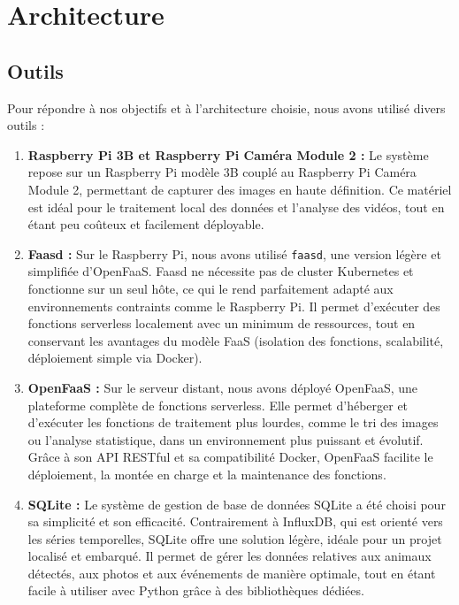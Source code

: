 \documentclass[a4paper,11pt]{article}
\begin{document}
	\section{Architecture}
	\subsection{Outils}
	Pour répondre à nos objectifs et à l’architecture choisie, nous avons utilisé divers outils :
	\begin{enumerate}
			
	\item \textbf{Raspberry Pi 3B et Raspberry Pi Caméra Module 2 :} Le système repose sur un Raspberry Pi modèle 3B couplé au Raspberry Pi Caméra Module 2, permettant de capturer des images en haute définition. Ce matériel est idéal pour le traitement local des données et l’analyse des vidéos, tout en étant peu coûteux et facilement déployable.
	
	\item \textbf{Faasd :} Sur le Raspberry Pi, nous avons utilisé \texttt{faasd}, une version légère et simplifiée d’OpenFaaS. Faasd ne nécessite pas de cluster Kubernetes et fonctionne sur un seul hôte, ce qui le rend parfaitement adapté aux environnements contraints comme le Raspberry Pi. Il permet d’exécuter des fonctions serverless localement avec un minimum de ressources, tout en conservant les avantages du modèle FaaS (isolation des fonctions, scalabilité, déploiement simple via Docker).
	
	\item \textbf{OpenFaaS :} Sur le serveur distant, nous avons déployé OpenFaaS, une plateforme complète de fonctions serverless. Elle permet d’héberger et d’exécuter les fonctions de traitement plus lourdes, comme le tri des images ou l’analyse statistique, dans un environnement plus puissant et évolutif. Grâce à son API RESTful et sa compatibilité Docker, OpenFaaS facilite le déploiement, la montée en charge et la maintenance des fonctions.
	
	\item \textbf{SQLite :} Le système de gestion de base de données SQLite a été choisi pour sa simplicité et son efficacité. Contrairement à InfluxDB, qui est orienté vers les séries temporelles, SQLite offre une solution légère, idéale pour un projet localisé et embarqué. Il permet de gérer les données relatives aux animaux détectés, aux photos et aux événements de manière optimale, tout en étant facile à utiliser avec Python grâce à des bibliothèques dédiées.
	

\end{enumerate}
\end{document}
